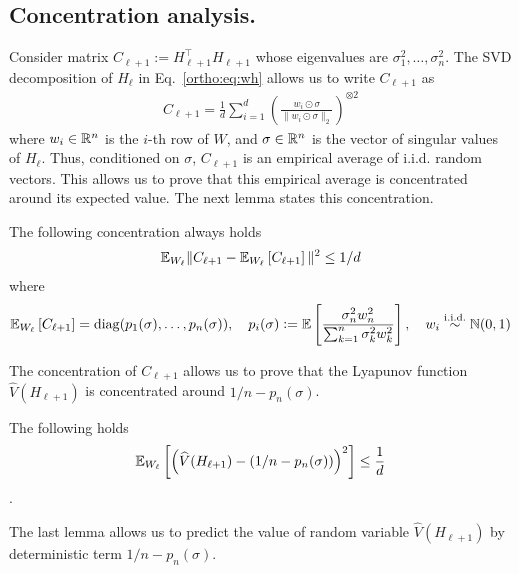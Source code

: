  \subsection*{Concentration analysis.}
 Consider matrix $C_{\ell+1} := H_{\ell+1}^\top H_{\ell+1}$ whose eigenvalues are $\sigma_1^2, \dots, \sigma_n^2$. The SVD decomposition of $H_\ell$ in Eq.~\eqref{ortho:eq:wh} allows us to write $C_{\ell+1}$ as 
 \begin{align*}
     C_{\ell+1} = \frac{1}{d}\sum_{i=1}^d \left( \frac{w_i \odot \sigma }{\| w_i \odot \sigma \|_2 } \right)^{\otimes 2}
 \end{align*}
 where $w_i \in \mathbb{R}^n$ is the $i$-th row of $W$, and $\sigma \in \mathbb{R}^n$ is the vector of singular values of $H_\ell$. Thus, conditioned on $\sigma$, $C_{\ell+1}$ is an empirical average of i.i.d. random vectors. This allows us to prove that this empirical average is concentrated around its expected value. The next lemma states this concentration. 
 \begin{lemma} \label{ortho:lemma:cov_concentration} 
 The following concentration always holds
 \begin{align*}
      \mathbb{E}_{W_{\ell}} \| C_{\ell+1} - \mathbb{E}_{W_\ell} \left[ C_{\ell+1}
     \right] \|^2 \leq 1/d  
 \end{align*}
 where 
 \begin{align} \label{ortho:eq:pn}
     \mathbb{E}_{W_\ell} \left[ C_{\ell+1}
     \right] = \mathrm{diag}(p_1(\sigma), \dots, p_n(\sigma)), \quad p_i(\sigma) := \mathbb{E} \left[ \frac{\sigma_n^2 w_n^2}{\sum_{k=1}^n \sigma_k^2 w_k^2} \right], \quad w_{i} \stackrel{\text{i.i.d.}}{\sim} \mathbb{N}(0,1)
 \end{align}
 \end{lemma}
 The concentration of $C_{\ell+1}$ allows us to prove that the Lyapunov function $\widehat{V}(H_{\ell+1})$ is concentrated around $1/n-p_n(\sigma)$. 
 \begin{lemma}
 The following holds 
 \label{ortho:lemma:concentration}
 \begin{align*}
  \mathbb{E}_{W_{\ell}} \left[ \left( \widehat{V}(H_{\ell+1}) - (1/n-p_n(\sigma))  \right)^2 \right] \leq \frac{1}{d}
  \end{align*}.
 \end{lemma}
 The last lemma allows us to predict the value of random variable $\widehat{V}(H_{\ell+1})$ by deterministic term $1/n-p_n(\sigma)$. 
